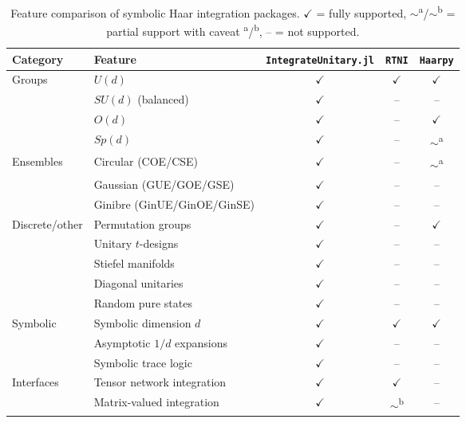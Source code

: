 \documentclass[manuscript,screen]{acmart}
\begin{document}
\begin{table}[t]
\centering
\caption{Feature comparison of symbolic Haar integration packages.
$\checkmark$ = fully supported, $\sim$\textsuperscript{a}/$\sim$\textsuperscript{b} = partial support with caveat \textsuperscript{a}/\textsuperscript{b},
-- = not supported.}
\label{tab:comparison}
\begin{tabular}{llccc}
\hline
Category & Feature & \texttt{IntegrateUnitary.jl} & \texttt{RTNI} & \texttt{Haarpy} \\
\hline
\multirow{4}{*}{Groups}
  & $U(d)$             & $\checkmark$ & $\checkmark$ & $\checkmark$ \\
  & $SU(d)$ (balanced)  & $\checkmark$ & --           & --           \\
  & $O(d)$             & $\checkmark$ & --           & $\checkmark$ \\
  & $Sp(d)$            & $\checkmark$ & --           & $\sim$\textsuperscript{a}       \\
\hline
\multirow{3}{*}{Ensembles}
  & Circular (COE/CSE) & $\checkmark$ & --           & $\sim$\textsuperscript{a}       \\
  & Gaussian (GUE/GOE/GSE) & $\checkmark$ & --       & --           \\
  & Ginibre (GinUE/GinOE/GinSE) & $\checkmark$ & --  & --           \\
\hline
\multirow{5}{*}{Discrete/other}
  & Permutation groups  & $\checkmark$ & --           & $\checkmark$ \\
  & Unitary $t$-designs & $\checkmark$ & --           & --           \\
  & Stiefel manifolds   & $\checkmark$ & --           & --           \\
  & Diagonal unitaries  & $\checkmark$ & --           & --           \\
  & Random pure states  & $\checkmark$ & --           & --           \\
\hline
\multirow{3}{*}{Symbolic}
  & Symbolic dimension $d$ & $\checkmark$ & $\checkmark$ & $\checkmark$ \\
  & Asymptotic $1/d$ expansions & $\checkmark$ & --   & --           \\
  & Symbolic trace logic & $\checkmark$ & --           & --           \\
\hline
\multirow{3}{*}{Interfaces}
  & Tensor network integration & $\checkmark$ & $\checkmark$ & --   \\
  & Matrix-valued integration  & $\checkmark$ & $\sim$\textsuperscript{b}       & --   \\

\end{tabular}
\end{table}
\end{document}
